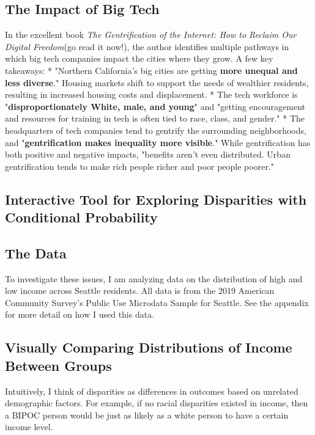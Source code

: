 \documentclass[12pt]{article}
\begin{document}
\subsection*{The Impact of Big Tech}

In the excellent book \textit{The Gentrification of the Internet: How to Reclaim Our Digital Freedom}\cite{gentrification}(go read it now!), the author identifies multiple pathways in which big tech companies impact the cities where they grow. A few key takeaways:
* "Northern California's big cities are getting \textbf{more unequal and less diverse}." Housing markets shift to support the needs of wealthier residents, resulting in increased housing costs and displacement.
* The tech workforce is "\textbf{disproportionately White, male, and young}" and "getting encouragement and resources for training in tech is often tied to race, class, and gender."
* The headquarters of tech companies tend to gentrify the surrounding neighborhoods, and "\textbf{gentrification makes inequality more visible}." While gentrification has both positive and negative impacts, "benefits aren't even distributed. Urban gentrification tends to make rich people richer and poor people poorer."

\subsection*{Interactive Tool for Exploring Disparities with Conditional Probability}



\subsection*{The Data}

To investigate these issues, I am analyzing data on the distribution of high and low income across Seattle residents. All data is from the 2019 American Community Survey's Public Use Microdata Sample for Seattle.\cite{acs}\cite{pums} See the appendix for more detail on how I used this data.

\subsection*{Visually Comparing Distributions of Income Between Groups}

Intuitively, I think of disparities as differences in outcomes based on unrelated demographic factors. For example, if no racial disparities existed in income, then a BIPOC person would be just as likely as a white person to have a certain income level.
\end{document}
